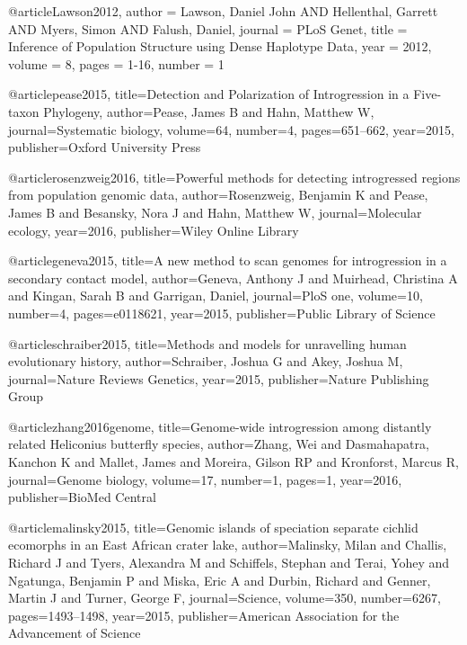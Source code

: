 @article{Lawson2012,
    author = {Lawson, Daniel John AND Hellenthal, Garrett AND Myers, Simon AND Falush, Daniel},
    journal = {PLoS Genet},
    title = {Inference of Population Structure using Dense Haplotype Data},
    year = {2012},
    volume = {8},
    pages = {1-16},
    number = {1}
}

@article{pease2015,
  title={Detection and Polarization of Introgression in a Five-taxon Phylogeny},
  author={Pease, James B and Hahn, Matthew W},
  journal={Systematic biology},
  volume={64},
  number={4},
  pages={651--662},
  year={2015},
  publisher={Oxford University Press}
}

@article{rosenzweig2016,
  title={Powerful methods for detecting introgressed regions from population genomic data},
  author={Rosenzweig, Benjamin K and Pease, James B and Besansky, Nora J and Hahn, Matthew W},
  journal={Molecular ecology},
  year={2016},
  publisher={Wiley Online Library}
}

@article{geneva2015,
  title={A new method to scan genomes for introgression in a secondary contact model},
  author={Geneva, Anthony J and Muirhead, Christina A and Kingan, Sarah B and Garrigan, Daniel},
  journal={PloS one},
  volume={10},
  number={4},
  pages={e0118621},
  year={2015},
  publisher={Public Library of Science}
}

@article{schraiber2015,
  title={Methods and models for unravelling human evolutionary history},
  author={Schraiber, Joshua G and Akey, Joshua M},
  journal={Nature Reviews Genetics},
  year={2015},
  publisher={Nature Publishing Group}
}





@article{zhang2016genome,
  title={Genome-wide introgression among distantly related Heliconius butterfly species},
  author={Zhang, Wei and Dasmahapatra, Kanchon K and Mallet, James and Moreira, Gilson RP and Kronforst, Marcus R},
  journal={Genome biology},
  volume={17},
  number={1},
  pages={1},
  year={2016},
  publisher={BioMed Central}
}

@article{malinsky2015,
  title={Genomic islands of speciation separate cichlid ecomorphs in an East African crater lake},
  author={Malinsky, Milan and Challis, Richard J and Tyers, Alexandra M and Schiffels, Stephan and Terai, Yohey and Ngatunga, Benjamin P and Miska, Eric A and Durbin, Richard and Genner, Martin J and Turner, George F},
  journal={Science},
  volume={350},
  number={6267},
  pages={1493--1498},
  year={2015},
  publisher={American Association for the Advancement of Science}
}

